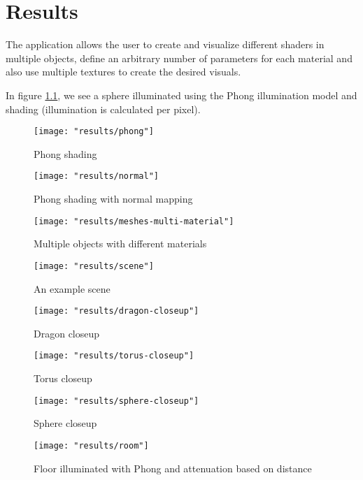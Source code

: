 \chapter{Results}
The application allows the user to create and visualize different shaders in multiple objects, define an arbitrary number of parameters for each material and also use multiple textures to create the desired visuals.

In figure \ref{fig:phong_sphere}, we see a sphere illuminated using the Phong illumination model and shading (illumination is calculated per pixel). 

\begin{figure}
    \centering
    \caption{Phong shading}
    \texttt{[image: "results/phong"]}
    \label{fig:phong_sphere}
\end{figure}

\begin{figure}
    \centering
    \caption{Phong shading with normal mapping}
    \texttt{[image: "results/normal"]}
    \label{fig:phong_normal_sphere}
\end{figure}

\begin{figure}
    \centering
    \caption{Multiple objects with different materials}
    \texttt{[image: "results/meshes-multi-material"]}
    \label{fig:scene_1}
\end{figure}

\begin{figure}
    \centering
    \caption{An example scene}
    \texttt{[image: "results/scene"]}
    \label{fig:scene_2}
\end{figure}

\begin{figure}
    \centering
    \caption{Dragon closeup}
    \texttt{[image: "results/dragon-closeup"]}
    \label{fig:dragon_closeup}
\end{figure}

\begin{figure}
    \centering
    \caption{Torus closeup}
    \texttt{[image: "results/torus-closeup"]}
    \label{fig:torus_closeup}
\end{figure}

\begin{figure}
    \centering
    \caption{Sphere closeup}
    \texttt{[image: "results/sphere-closeup"]}
    \label{fig:sphere_closeup}
\end{figure}

\begin{figure}
    \centering
    \texttt{[image: "results/room"]}
    \caption{Floor illuminated with Phong and attenuation based on distance}
    \label{fig:room_floor}
\end{figure}
